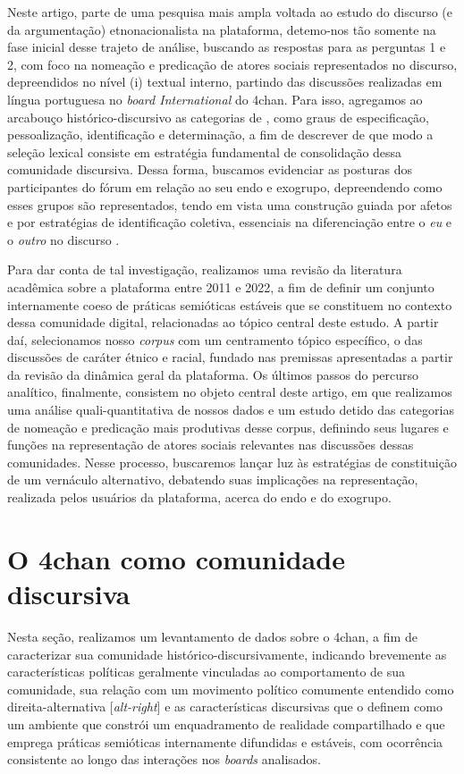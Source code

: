 \documentclass[portuguese]{textolivre}
\begin{document}
Neste artigo, parte de uma pesquisa mais ampla voltada ao estudo do discurso (e da argumentação) etnonacionalista na plataforma, detemo-nos tão somente na fase inicial desse trajeto de análise, buscando as respostas para as perguntas 1 e 2, com foco na nomeação e predicação de atores sociais representados no discurso, depreendidos no nível (i) textual interno, partindo das discussões realizadas em língua portuguesa no \emph{board International} do 4chan. Para isso, agregamos ao arcabouço histórico-discursivo as categorias de \textcite{van1996representation}, como graus de especificação, pessoalização, identificação e determinação, a fim de descrever de que modo a seleção lexical consiste em estratégia fundamental de consolidação dessa comunidade discursiva. Dessa forma, buscamos evidenciar as posturas dos participantes do fórum em relação ao seu endo e exogrupo, depreendendo como esses grupos são representados, tendo em vista uma construção guiada por afetos e por estratégias de identificação coletiva, essenciais na diferenciação entre o \emph{eu} e o \emph{outro} no discurso \cite{mouffe2018left}.

Para dar conta de tal investigação, realizamos uma revisão da literatura acadêmica sobre a plataforma entre 2011 e 2022, a fim de definir um conjunto internamente coeso de práticas semióticas estáveis que se constituem no contexto dessa comunidade digital, relacionadas ao tópico central deste estudo. A partir daí, selecionamos nosso \emph{corpus} com um centramento tópico específico, o das discussões de caráter étnico e racial, fundado nas premissas apresentadas a partir da revisão da dinâmica geral da plataforma. Os últimos passos do percurso analítico, finalmente, consistem no objeto central deste artigo, em que realizamos uma análise quali-quantitativa de nossos dados e um estudo detido das categorias de nomeação e predicação mais produtivas desse corpus, definindo seus lugares e funções na representação de atores sociais relevantes nas discussões dessas comunidades. Nesse processo, buscaremos lançar luz às estratégias de constituição de um vernáculo alternativo, debatendo suas implicações na representação, realizada pelos usuários da plataforma, acerca do endo e do exogrupo. 


\section{O 4chan como comunidade discursiva}\label{sec2}

Nesta seção, realizamos um levantamento de dados sobre o 4chan, a fim de caracterizar sua comunidade histórico-discursivamente, indicando brevemente as características políticas geralmente vinculadas ao comportamento de sua comunidade, sua relação com um movimento político comumente entendido como direita-alternativa [\emph{alt-right}] \cite{nagle2017kill} e as características discursivas que o definem como um ambiente que constrói um enquadramento de realidade compartilhado e que emprega práticas semióticas internamente difundidas e estáveis, com ocorrência consistente ao longo das interações nos \emph{boards} analisados. 
\end{document}
